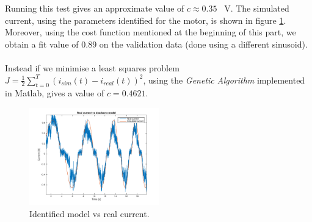 Running this test gives an approximate value of $c \approx 0.35$ \SI{}{\volt}. The simulated current, using the parameters identified for the motor, is shown in figure \ref{fig:deadzone_sim}. Moreover, using the cost function  mentioned at the beginning of this part, we obtain a fit value of $0.89$ on the validation data (done using a different sinusoid). \\ \\
Instead if we minimise a least squares problem $J = \frac{1}{2} \sum_{t=0}^T (i_{sim}(t) -i_{real}(t))^2$, using the \emph{Genetic Algorithm} implemented in Matlab, gives a value of $c =0.4621$.
  \begin{figure}[!h]
  \centering
  \includegraphics[width=0.5\textwidth]{img/deadzone3.png}
  \caption{Identified model vs real current.}
    \label{fig:deadzone_sim}
\end{figure}
